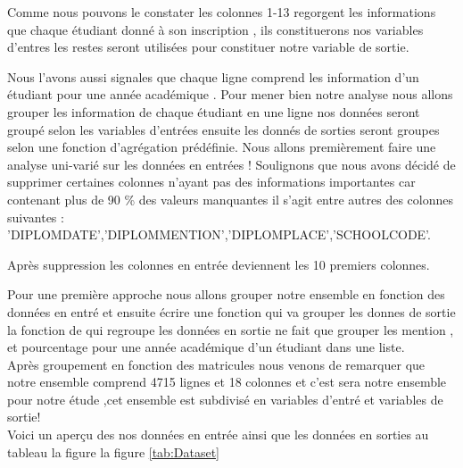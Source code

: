  Comme nous pouvons le constater les colonnes 1-13 regorgent les informations que chaque étudiant donné à son inscription , ils constituerons nos variables d'entres les restes seront utilisées pour constituer notre variable de sortie.

Nous l'avons aussi signales que chaque ligne comprend les information
d'un étudiant pour une année académique . Pour mener bien notre analyse nous allons grouper les information de chaque étudiant en une ligne nos données seront groupé selon les variables d'entrées ensuite les donnés de sorties seront groupes selon une fonction d'agrégation prédéfinie.
Nous allons premièrement faire une analyse uni-varié  sur les données en entrées !
Soulignons que nous avons décidé de supprimer certaines colonnes n'ayant pas des informations importantes car contenant plus de 90 \% des valeurs manquantes il s'agit entre autres des colonnes suivantes :
'DIPLOMDATE','DIPLOMMENTION','DIPLOMPLACE','SCHOOLCODE'.

Après suppression les colonnes en entrée deviennent les 10 premiers colonnes.

Pour une première approche nous allons grouper notre ensemble en fonction des données en entré et ensuite écrire une fonction qui va grouper les donnes de sortie la fonction de qui regroupe les données en sortie ne fait que grouper les mention , et pourcentage pour une année académique d'un étudiant dans une liste.\\ 
Après groupement en fonction des matricules nous venons de remarquer que
notre ensemble comprend 4715 lignes et 18 colonnes et c'est sera notre ensemble pour notre étude ,cet ensemble est subdivisé en variables d'entré et variables de
sortie!\\
Voici un aperçu des nos données en entrée ainsi que les données en sorties  au tableau la figure la figure \ref{tab:Dataset}
